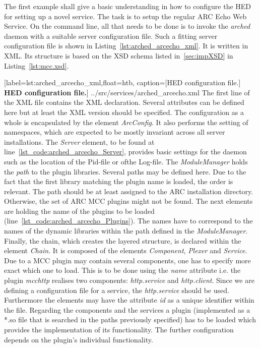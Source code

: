The first example shall give a basic understanding in how to configure the HED for setting up a novel service.
The task is to setup the regular ARC Echo Web Service.
On the command line, all that needs to be done is to invoke the \textit{arched} daemon with a suitable server configuration file.
Such a fitting server configuration file is shown in Listing~\ref{lst:arched_arcecho_xml}.
It is written in XML. Its structure is based on the XSD schema listed in~\ref{sec:impXSD} in Listing~\ref{lst:mcc.xsd}.\\ 


	[label=lst:arched_arcecho_xml,float=htb,
	caption={[HED configuration file.]
	\textbf{HED configuration file.}}]
{../src/services/arched_arcecho.xml}
The first line of the XML file contains the XML declaration.
Several attributes can be defined here but at least the XML version should be specified.
The configuration as a whole is encapsulated by the element \textit{ArcConfig}. It also performs the setting of namespaces, which are expected to be mostly invariant across all server installations. %
The \textit{Server} element, to be found at line~\ref{lst_code:arched_arcecho_Server}, provides basic settings for the daemon such as the location of the Pid-file or ofthe Log-file.
The \textit{ModuleManager} holds the \textit{path} to the plugin libraries.
Several paths may be defined here.
Due to the fact that the first library matching the plugin name is loaded, the order is relevant.
The path should be at least assigned to the ARC installation directory.
Otherwise, the set of ARC MCC plugins might not be found.
The next elements are holding the name of the plugins to be loaded (line~\ref{lst_code:arched_arcecho_Plugins}).
The names have to correspond to the names of the dynamic libraries within the path defined in the \textit{ModuleManager}.
Finally, the chain, which creates the layered structure, is declared within the element \textit{Chain}.
It is composed of the elements \textit{Component}, \textit{Plexer} and \textit{Service}.
Due to a MCC plugin may contain several components, one has to specify more exact which one to load. This is to be done using the \textit{name} attribute i.e. the plugin \textit{mcchttp} realises two components: \textit{http.service} and \textit{http.client}. Since we are defining a configuration file for a service, the \textit{http.service} should be used.
Furthermore the elements may have the attribute \textit{id} as a unique identifier within the file.
Regarding the components and the services a plugin (implemented as a *.so file that is searched in the paths previously specified) has to be loaded which provides the implementation of its functionality. The further configuration depends on the plugin's individual functionality.\\
%
%


